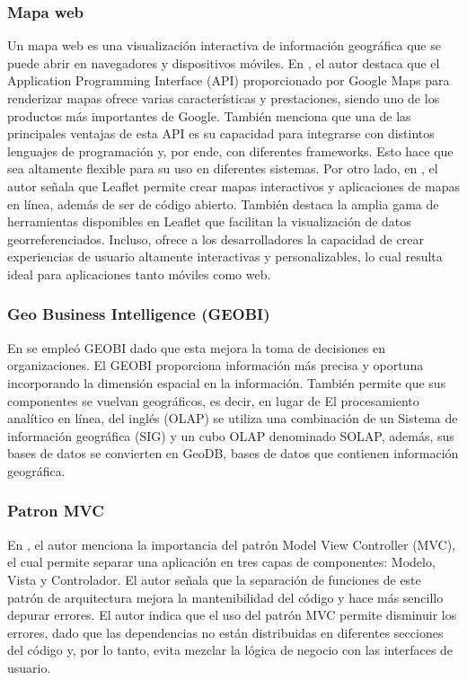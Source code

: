 \subsubsection{Mapa web}
Un mapa web es una visualización interactiva de información geográfica que se puede abrir en navegadores y dispositivos móviles.
En \cite{botto-tobarAppliedTechnologiesSecond2021}, el autor destaca que el Application Programming Interface (API) proporcionado por Google Maps para renderizar
mapas ofrece varias características y prestaciones, siendo uno de los productos más importantes de Google. También menciona que
una de las principales ventajas de esta API es su capacidad para integrarse con distintos lenguajes de programación y, por ende,
con diferentes frameworks. Esto hace que sea altamente flexible para su uso en diferentes sistemas. Por otro lado, en
\cite{gomezcantilloAplicativoMovilPara}, el autor señala que Leaflet permite crear mapas interactivos y aplicaciones de
mapas en línea, además de ser de código abierto. También destaca la amplia gama de herramientas disponibles en Leaflet que
facilitan la visualización de datos georreferenciados. Incluso, ofrece a los desarrolladores la capacidad de crear experiencias
de usuario altamente interactivas y personalizables, lo cual resulta ideal para aplicaciones tanto móviles como web.

\subsubsection{Geo Business Intelligence (GEOBI)}
En \cite{herreraGeoBIBigVGI2015} se empleó GEOBI dado que esta mejora la toma de decisiones en organizaciones. El
GEOBI proporciona información más precisa y oportuna incorporando la dimensión espacial en la información. También
permite que sus componentes se vuelvan geográficos, es decir, en lugar de El procesamiento analítico en línea, del inglés
(OLAP) se utiliza una combinación de un Sistema de información geográfica (SIG) y un cubo OLAP denominado SOLAP, además,
sus bases de datos se convierten en GeoDB, bases de datos que contienen información geográfica.

\subsubsection{Patron MVC}
En \cite{lesanoperezAplicativoMovilGeoubicacion2022}, el autor menciona la importancia del patrón Model View Controller
(MVC), el cual permite separar una aplicación en tres capas de componentes: Modelo, Vista y Controlador. El autor señala que
la separación de funciones de este patrón de arquitectura mejora la mantenibilidad del código y hace más sencillo depurar
errores. El autor indica que el uso del patrón MVC permite disminuir los errores, dado que las dependencias no están
distribuidas en diferentes secciones del código y, por lo tanto, evita mezclar la lógica de negocio con las interfaces
de usuario.

